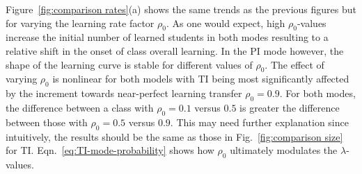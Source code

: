 \documentclass[twocolumn,secnumarabic,amssymb, nobibnotes, aps, prd]{revtex4-2}
\begin{document}
        Figure~\ref{fig:comparison rates}(a) shows the same trends as the previous figures but for varying the learning rate factor $\rho_0$.
        As one would expect, high $\rho_0$-values increase the initial number of learned students in both modes resulting to a relative shift in the onset of class overall learning.
        In the PI mode however, the shape of the learning curve is stable for different values of $\rho_0$.
        The effect of varying $\rho_0$ is nonlinear for both models with TI being most significantly affected by the increment towards near-perfect learning transfer $\rho_0={0.9}$.
        For both modes, the difference between a class with $\rho_0=0.1$ versus $0.5$ is greater the difference between those with $\rho_0=0.5$ {versus} $0.9$.
        {\color{red}
        This may need further explanation since intuitively, the results should be the same as those in Fig.~\ref{fig:comparison size} for TI.
        Eqn.~\ref{eq:TI-mode-probability} shows how $\rho_0$ ultimately modulates the $\lambda$-values.
        }
\end{document}
